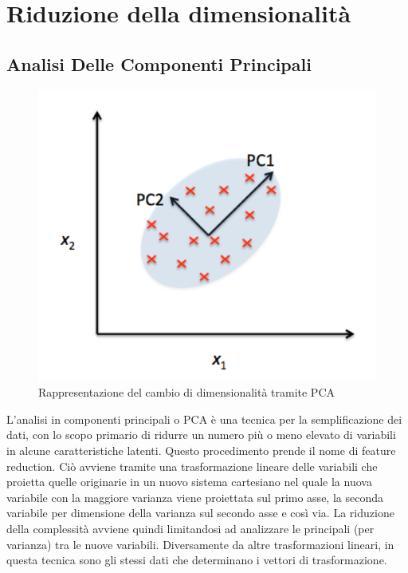 \section{Riduzione della dimensionalità}
\subsection{Analisi Delle Componenti Principali}
\begin{figure}[]
	\centering
	\includegraphics[scale=0.8]{images/pca.png}
	\caption{Rappresentazione del cambio di dimensionalità tramite PCA}
\end{figure}
L'analisi in componenti principali o PCA è una tecnica per la semplificazione dei dati, con lo scopo primario di ridurre un numero più o meno elevato di variabili in alcune caratteristiche latenti. Questo procedimento prende il nome di feature reduction. Ciò avviene tramite una trasformazione lineare delle variabili che proietta quelle originarie in un nuovo sistema cartesiano nel quale la nuova variabile con la maggiore varianza viene proiettata sul primo asse, la seconda variabile per dimensione della varianza sul secondo asse e così via. La riduzione della complessità avviene quindi limitandosi ad analizzare le principali (per varianza) tra le nuove variabili. Diversamente da altre trasformazioni lineari, in questa tecnica sono gli stessi dati che determinano i vettori di trasformazione.\\
